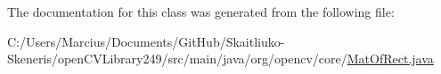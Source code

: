 The documentation for this class was generated from the following file\+:\begin{DoxyCompactItemize}
\item 
C\+:/\+Users/\+Marcius/\+Documents/\+Git\+Hub/\+Skaitliuko-\/\+Skeneris/open\+C\+V\+Library249/src/main/java/org/opencv/core/\mbox{\hyperlink{_mat_of_rect_8java}{Mat\+Of\+Rect.\+java}}\end{DoxyCompactItemize}
